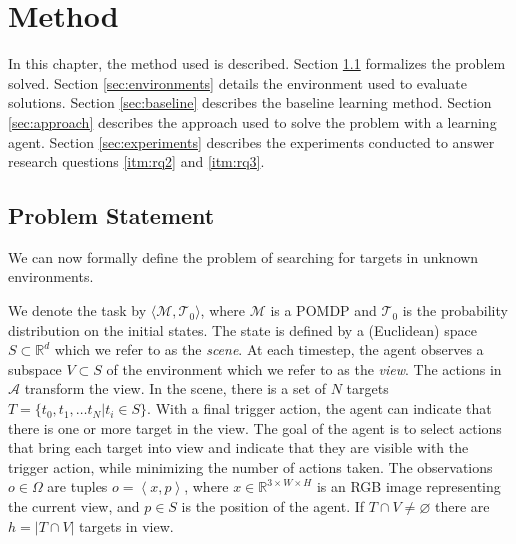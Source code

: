 \chapter{Method}
\label{cha:method}


% 

In this chapter, the method used is described.
Section \ref{sec:problem} formalizes the problem solved.
Section \ref{sec:environments} details the environment used to evaluate solutions.
Section \ref{sec:baseline} describes the baseline learning method.
Section \ref{sec:approach} describes the approach used to solve the problem with a learning agent.
Section \ref{sec:experiments} describes the experiments conducted to answer research questions \ref{itm:rq2} and \ref{itm:rq3}.

\section{Problem Statement}
\label{sec:problem}


We can now formally define the problem of searching for targets in unknown environments.

We denote the task by \(\langle \mathcal{M}, \mathcal{T}_0 \rangle\), where \(\mathcal{M}\) is a POMDP and \(\mathcal{T}_0\) is the probability distribution on the initial states.
The state is defined by a (Euclidean) space \(S \subset \mathbb{R}^d\) which we refer to as the \textit{scene}.
At each timestep, the agent observes a subspace \(V \subset S\) of the environment which we refer to as the \textit{view}.
The actions in \(\mathcal{A}\) transform the view.
In the scene, there is a set of \(N\) targets \(T = \{t_0, t_1, \dots t_N | t_i \in S\}\).
With a final trigger action, the agent can indicate that there is one or more target in the view.
The goal of the agent is to select actions that bring each target into view and indicate that they are visible with the trigger action, while minimizing the number of actions taken.
The observations \(o \in \Omega\) are tuples \(o = \left\langle x, p \right\rangle\),
where \(x \in \mathbb{R}^{3 \times W \times H}\) is an RGB image representing the current view, and \(p \in S\) is the position of the agent.
If \(T \cap V \neq \varnothing\) there are \(h = \left\lvert T \cap V \right\rvert\) targets in view.

